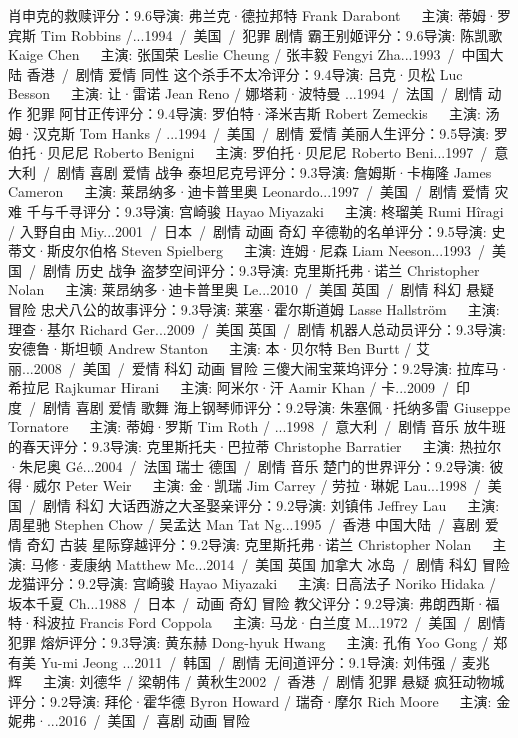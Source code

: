 肖申克的救赎评分：9.6导演: 弗兰克·德拉邦特 Frank Darabont   主演: 蒂姆·罗宾斯 Tim Robbins /...1994 / 美国 / 犯罪 剧情
霸王别姬评分：9.6导演: 陈凯歌 Kaige Chen   主演: 张国荣 Leslie Cheung / 张丰毅 Fengyi Zha...1993 / 中国大陆 香港 / 剧情 爱情 同性
这个杀手不太冷评分：9.4导演: 吕克·贝松 Luc Besson   主演: 让·雷诺 Jean Reno / 娜塔莉·波特曼 ...1994 / 法国 / 剧情 动作 犯罪
阿甘正传评分：9.4导演: 罗伯特·泽米吉斯 Robert Zemeckis   主演: 汤姆·汉克斯 Tom Hanks / ...1994 / 美国 / 剧情 爱情
美丽人生评分：9.5导演: 罗伯托·贝尼尼 Roberto Benigni   主演: 罗伯托·贝尼尼 Roberto Beni...1997 / 意大利 / 剧情 喜剧 爱情 战争
泰坦尼克号评分：9.3导演: 詹姆斯·卡梅隆 James Cameron   主演: 莱昂纳多·迪卡普里奥 Leonardo...1997 / 美国 / 剧情 爱情 灾难
千与千寻评分：9.3导演: 宫崎骏 Hayao Miyazaki   主演: 柊瑠美 Rumi Hîragi / 入野自由 Miy...2001 / 日本 / 剧情 动画 奇幻
辛德勒的名单评分：9.5导演: 史蒂文·斯皮尔伯格 Steven Spielberg   主演: 连姆·尼森 Liam Neeson...1993 / 美国 / 剧情 历史 战争
盗梦空间评分：9.3导演: 克里斯托弗·诺兰 Christopher Nolan   主演: 莱昂纳多·迪卡普里奥 Le...2010 / 美国 英国 / 剧情 科幻 悬疑 冒险
忠犬八公的故事评分：9.3导演: 莱塞·霍尔斯道姆 Lasse Hallström   主演: 理查·基尔 Richard Ger...2009 / 美国 英国 / 剧情
机器人总动员评分：9.3导演: 安德鲁·斯坦顿 Andrew Stanton   主演: 本·贝尔特 Ben Burtt / 艾丽...2008 / 美国 / 爱情 科幻 动画 冒险
三傻大闹宝莱坞评分：9.2导演: 拉库马·希拉尼 Rajkumar Hirani   主演: 阿米尔·汗 Aamir Khan / 卡...2009 / 印度 / 剧情 喜剧 爱情 歌舞
海上钢琴师评分：9.2导演: 朱塞佩·托纳多雷 Giuseppe Tornatore   主演: 蒂姆·罗斯 Tim Roth / ...1998 / 意大利 / 剧情 音乐
放牛班的春天评分：9.3导演: 克里斯托夫·巴拉蒂 Christophe Barratier   主演: 热拉尔·朱尼奥 Gé...2004 / 法国 瑞士 德国 / 剧情 音乐
楚门的世界评分：9.2导演: 彼得·威尔 Peter Weir   主演: 金·凯瑞 Jim Carrey / 劳拉·琳妮 Lau...1998 / 美国 / 剧情 科幻
大话西游之大圣娶亲评分：9.2导演: 刘镇伟 Jeffrey Lau   主演: 周星驰 Stephen Chow / 吴孟达 Man Tat Ng...1995 / 香港 中国大陆 / 喜剧 爱情 奇幻 古装
星际穿越评分：9.2导演: 克里斯托弗·诺兰 Christopher Nolan   主演: 马修·麦康纳 Matthew Mc...2014 / 美国 英国 加拿大 冰岛 / 剧情 科幻 冒险
龙猫评分：9.2导演: 宫崎骏 Hayao Miyazaki   主演: 日高法子 Noriko Hidaka / 坂本千夏 Ch...1988 / 日本 / 动画 奇幻 冒险
教父评分：9.2导演: 弗朗西斯·福特·科波拉 Francis Ford Coppola   主演: 马龙·白兰度 M...1972 / 美国 / 剧情 犯罪
熔炉评分：9.3导演: 黄东赫 Dong-hyuk Hwang   主演: 孔侑 Yoo Gong / 郑有美 Yu-mi Jeong ...2011 / 韩国 / 剧情
无间道评分：9.1导演: 刘伟强 / 麦兆辉   主演: 刘德华 / 梁朝伟 / 黄秋生2002 / 香港 / 剧情 犯罪 悬疑
疯狂动物城评分：9.2导演: 拜伦·霍华德 Byron Howard / 瑞奇·摩尔 Rich Moore   主演: 金妮弗·...2016 / 美国 / 喜剧 动画 冒险
